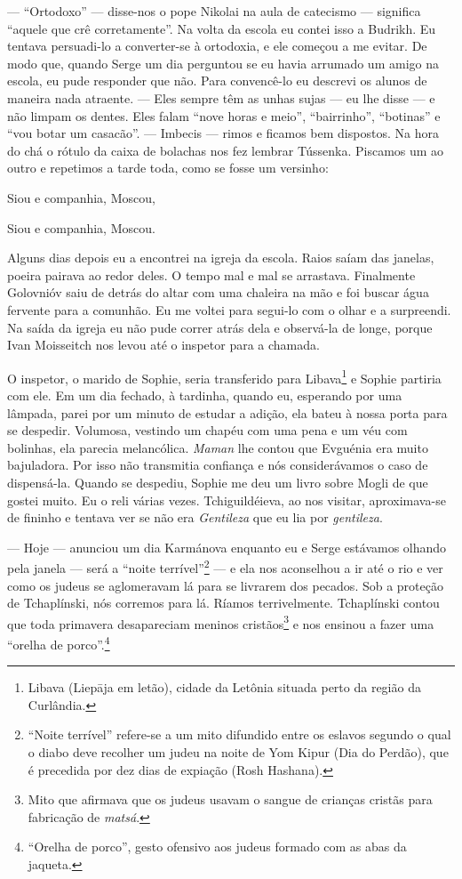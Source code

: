 --- ``Ortodoxo'' --- disse-nos o pope Nikolai na aula de catecismo ---
significa ``aquele que crê corretamente''. Na volta da escola eu contei
isso a Budrikh. Eu tentava persuadi-lo a converter-se à ortodoxia, e ele
começou a me evitar. De modo que, quando Serge um dia perguntou se eu
havia arrumado um amigo na escola, eu pude responder que não. Para
convencê-lo eu descrevi os alunos de maneira nada atraente. --- Eles
sempre têm as unhas sujas --- eu lhe disse --- e não limpam os dentes.
Eles falam ``nove horas e meio'', ``bairrinho'', ``botinas'' e ``vou
botar um casacão''. --- Imbecis --- rimos e ficamos bem dispostos. Na
hora do chá o rótulo da caixa de bolachas nos fez lembrar Tússenka.
Piscamos um ao outro e repetimos a tarde toda, como se fosse um
versinho:

Siou e companhia, Moscou,

Siou e companhia, Moscou.

Alguns dias depois eu a encontrei na igreja da escola. Raios saíam das
janelas, poeira pairava ao redor deles. O tempo mal e mal se arrastava.
Finalmente Golovnióv saiu de detrás do altar com uma chaleira na mão e
foi buscar água fervente para a comunhão. Eu me voltei para segui-lo com
o olhar e a surpreendi. Na saída da igreja eu não pude correr atrás dela
e observá-la de longe, porque Ivan Moisseitch nos levou até o inspetor
para a chamada.

O inspetor, o marido de Sophie, seria transferido para Libava\footnote{Libava
  (Liepāja em letão), cidade da Letônia situada perto da região da
  Curlândia.} e Sophie partiria com ele. Em um dia fechado, à tardinha,
quando eu, esperando por uma lâmpada, parei por um minuto de estudar a
adição, ela bateu à nossa porta para se despedir. Volumosa, vestindo um
chapéu com uma pena e um véu com bolinhas, ela parecia melancólica.
\emph{Maman} lhe contou que Evguénia era muito bajuladora. Por isso não
transmitia confiança e nós considerávamos o caso de dispensá-la. Quando
se despediu, Sophie me deu um livro sobre Mogli de que gostei muito. Eu
o reli várias vezes. Tchiguildéieva, ao nos visitar, aproximava-se de
fininho e tentava ver se não era \emph{Gentileza} que eu lia por
\emph{gentileza}.

--- Hoje --- anunciou um dia Karmánova enquanto eu e Serge estávamos
olhando pela janela --- será a ``noite terrível''\footnote{``Noite
  terrível'' refere-se a um mito difundido entre os eslavos segundo o
  qual o diabo deve recolher um judeu na noite de Yom Kipur (Dia do
  Perdão), que é precedida por dez dias de expiação (Rosh Hashana).} ---
e ela nos aconselhou a ir até o rio e ver como os judeus se aglomeravam
lá para se livrarem dos pecados. Sob a proteção de Tchaplínski, nós
corremos para lá. Ríamos terrivelmente. Tchaplínski contou que toda
primavera desapareciam meninos cristãos\footnote{Mito que afirmava que
  os judeus usavam o sangue de crianças cristãs para fabricação de
  \emph{matsá}.} e nos ensinou a fazer uma ``orelha de
porco''.\footnote{``Orelha de porco'', gesto ofensivo aos judeus formado
  com as abas da jaqueta.}

